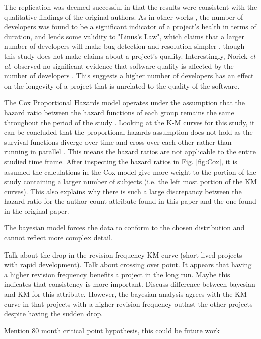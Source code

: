 \documentclass[acmconf]{acmart}
\begin{document}
The replication was deemed successful in that the results were consistent with the qualitative findings of the original authors.
As in other works \cite{samoladas2010survival}, the number of developers was found to be a significant indicator of a project's health in terms of duration, and lends some validity to "Linus's Law", which claims that a larger number of developers will make bug detection and resolution simpler \cite{raymond2001LinusLaw}, though this study does not make claims about a project's quality.
Interestingly, Norick \emph{et al.} observed no significant evidence that software quality is affected by the number of developers \cite{norick2010effects}.
This suggests a higher number of developers has an effect on the longevity of a project that is unrelated to the quality of the software.

The Cox Proportional Hazards model operates under the assumption that the hazard ratio between the hazard functions of each group remains the same throughout the period of the study \cite{stel2011cox}.
Looking at the K-M curves for this study, it can be concluded that the proportional hazards assumption does not hold as the survival functions diverge over time and cross over each other rather than running in parallel \cite{persson2007ACO}.
This means the hazard ratios are not applicable to the entire studied time frame.
After inspecting the hazard ratios in Fig. \ref{fig:Cox}, it is assumed the calculations in the Cox model give more weight to the portion of the study containing a larger number of subjects (i.e. the left most portion of the KM curves).
This also explains why there is such a large discrepancy between the hazard ratio for the author count attribute found in this paper and the one found in the original paper.

The bayesian model forces the data to conform to the chosen distribution and cannot reflect more complex detail.

Talk about the drop in the revision frequency KM curve (short lived projects with rapid development).
Talk about crossing over point.
It appears that having a higher revision frequency benefits a project in the long run.
Maybe this indicates that consistency is more important.
Discuss difference between bayesian and KM for this attribute.
However, the bayesian analysis agrees with the KM curve in that projects with a higher revision frequency outlast the other projects despite having the sudden drop.


Mention 80 month critical point hypothesis, this could be future work
\end{document}
